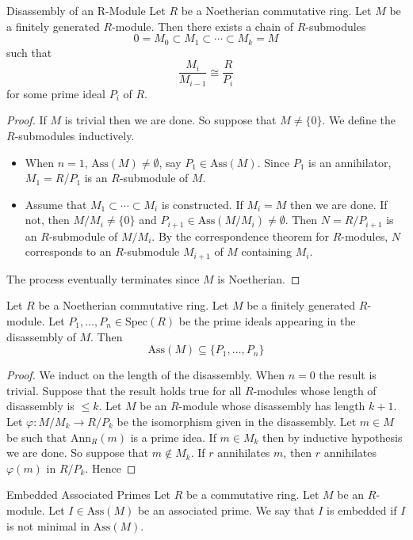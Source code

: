 \documentclass[a4paper]{article}
\begin{document}
\begin{thm}{Disassembly of an R-Module}{} Let $R$ be a Noetherian commutative ring. Let $M$ be a finitely generated $R$-module. Then there exists a chain of $R$-submodules $$0=M_0\subset M_1\subset\cdots\subset M_k=M$$ such that $$\frac{M_i}{M_{i-1}}\cong\frac{R}{P_i}$$ for some prime ideal $P_i$ of $R$. \tcbline
\begin{proof}
If $M$ is trivial then we are done. So suppose that $M\neq\{0\}$. We define the $R$-submodules inductively. 
\begin{itemize}
\item When $n=1$, $\text{Ass}(M)\neq\emptyset$, say $P_1\in\text{Ass}(M)$. Since $P_1$ is an annihilator, $M_1=R/P_1$ is an $R$-submodule of $M$.
\item Assume that $M_1\subset\cdots\subset M_i$ is constructed. If $M_i=M$ then we are done. If not, then $M/M_i\neq\{0\}$ and $P_{i+1}\in\text{Ass}(M/M_i)\neq\emptyset$. Then $N=R/P_{i+1}$ is an $R$-submodule of $M/M_i$. By the correspondence theorem for $R$-modules, $N$ corresponds to an $R$-submodule $M_{i+1}$ of $M$ containing $M_i$. 
\end{itemize}
The process eventually terminates since $M$ is Noetherian. 
\end{proof}
\end{thm}

\begin{prp}{}{} Let $R$ be a Noetherian commutative ring. Let $M$ be a finitely generated $R$-module. Let $P_1,\dots,P_n\in\text{Spec}(R)$ be the prime ideals appearing in the disassembly of $M$. Then $$\text{Ass}(M)\subseteq\{P_1,\dots,P_n\}$$ \tcbline
\begin{proof}
We induct on the length of the disassembly. When $n=0$ the result is trivial. Suppose that the result holds true for all $R$-modules whose length of disassembly is $\leq k$. Let $M$ be an $R$-module whose disassembly has length $k+1$. Let $\varphi:M/M_k\to R/P_k$ be the isomorphism given in the disassembly. Let $m\in M$ be such that $\text{Ann}_R(m)$ is a prime idea. If $m\in M_k$ then by inductive hypothesis we are done. So suppose that $m\notin M_k$. If $r$ annihilates $m$, then $r$ annihilates $\varphi(m)$ in $R/P_k$. Hence 
\end{proof}
\end{prp}

\begin{defn}{Embedded Associated Primes}{} Let $R$ be a commutative ring. Let $M$ be an $R$-module. Let $I\in\text{Ass}(M)$ be an associated prime. We say that $I$ is embedded if $I$ is not minimal in $\text{Ass}(M)$. 
\end{defn}
\end{document}
